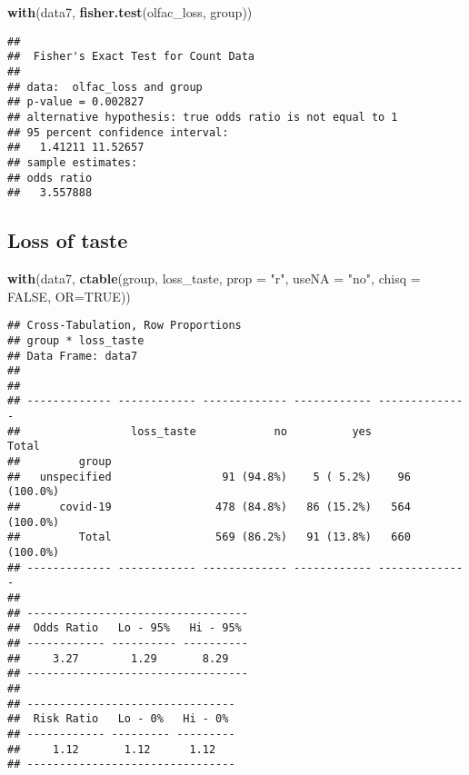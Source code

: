 \documentclass[
]{article}
\newenvironment{Shaded}{\begin{snugshade}}{\end{snugshade}}
\newcommand{\DataTypeTok}[1]{\textcolor[rgb]{0.13,0.29,0.53}{#1}}
\newcommand{\KeywordTok}[1]{\textcolor[rgb]{0.13,0.29,0.53}{\textbf{#1}}}
\newcommand{\NormalTok}[1]{#1}
\newcommand{\OtherTok}[1]{\textcolor[rgb]{0.56,0.35,0.01}{#1}}
\newcommand{\StringTok}[1]{\textcolor[rgb]{0.31,0.60,0.02}{#1}}
\begin{document}
\begin{Shaded}
\begin{Highlighting}[]
\KeywordTok{with}\NormalTok{(data7, }\KeywordTok{fisher.test}\NormalTok{(olfac_loss, group))}
\end{Highlighting}
\end{Shaded}

\begin{verbatim}
## 
##  Fisher's Exact Test for Count Data
## 
## data:  olfac_loss and group
## p-value = 0.002827
## alternative hypothesis: true odds ratio is not equal to 1
## 95 percent confidence interval:
##   1.41211 11.52657
## sample estimates:
## odds ratio 
##   3.557888
\end{verbatim}

\hypertarget{loss-of-taste}{%
\subsection{Loss of taste}\label{loss-of-taste}}

\begin{Shaded}
\begin{Highlighting}[]
\KeywordTok{with}\NormalTok{(data7, }\KeywordTok{ctable}\NormalTok{(group, loss_taste, }\DataTypeTok{prop =} \StringTok{"r"}\NormalTok{, }\DataTypeTok{useNA =} \StringTok{"no"}\NormalTok{, }\DataTypeTok{chisq =} \OtherTok{FALSE}\NormalTok{, }\DataTypeTok{OR=}\OtherTok{TRUE}\NormalTok{))}
\end{Highlighting}
\end{Shaded}

\begin{verbatim}
## Cross-Tabulation, Row Proportions  
## group * loss_taste  
## Data Frame: data7  
## 
## 
## ------------- ------------ ------------- ------------ --------------
##                 loss_taste            no          yes          Total
##         group                                                       
##   unspecified                 91 (94.8%)    5 ( 5.2%)    96 (100.0%)
##      covid-19                478 (84.8%)   86 (15.2%)   564 (100.0%)
##         Total                569 (86.2%)   91 (13.8%)   660 (100.0%)
## ------------- ------------ ------------- ------------ --------------
## 
## ----------------------------------
##  Odds Ratio   Lo - 95%   Hi - 95% 
## ------------ ---------- ----------
##     3.27        1.29       8.29   
## ----------------------------------
## 
## --------------------------------
##  Risk Ratio   Lo - 0%   Hi - 0% 
## ------------ --------- ---------
##     1.12       1.12      1.12   
## --------------------------------
\end{verbatim}
\end{document}
